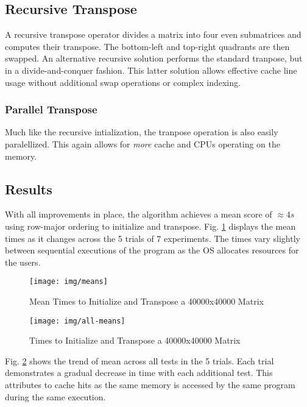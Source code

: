 \documentclass[conference]{IEEEtran}
\begin{document}
\subsection{Recursive Transpose}\label{recursive-transpose}

A recursive transpose operator divides a matrix into four even
submatrices and computes their transpose. The bottom-left and top-right
quadrants are then swapped. An alternative recursive solution performs
the standard tranpose, but in a divide-and-conquer fashion. This latter
solution allows effective cache line usage without additional swap
operations or complex indexing.

\subsubsection{Parallel Transpose}\label{parallel-transpose}

Much like the recursive intialization, the tranpose operation is also
easily paralellized. This again allows for \emph{more} cache and CPUs
operating on the memory.

\subsection{Results}\label{results}

With all improvements in place, the algorithm achieves a mean score of
\(\approx 4s\) using row-major ordering to initialize and transpose.
Fig. \ref{means} displays the mean times as it changes across the 5
trials of 7 experiments. The times vary slightly between sequential
executions of the program as the OS allocates resources for the users.

\begin{figure}[ht]
\centering
\caption{Mean Times to Initialize and Transpose a 40000x40000 Matrix}
\label{means}
\texttt{[image: img/means]}
\end{figure}

\begin{figure}[ht]
\centering
\caption{Times to Initialize and Transpose a 40000x40000 Matrix}
\label{all-means}
\texttt{[image: img/all-means]}
\end{figure}

Fig. \ref{all-means} shows the trend of mean across all tests in the 5
trials. Each trial demonstrates a gradual decrease in time with each
additional test. This attributes to cache hits as the same memory is
accessed by the same program during the same execution.
\end{document}
